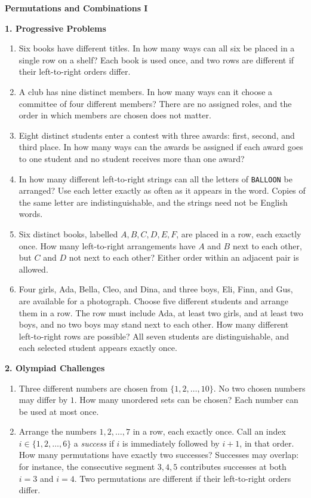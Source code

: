 \documentclass[11pt]{article}
\newcommand{\stageheading}[1]{%
  \par\Needspace{6\baselineskip}%
  \addvspace{.65\baselineskip}%
  {\centering\large\bfseries #1\par}%
  \nopagebreak[4]}
\begin{document}
{\centering\Large\bfseries Permutations and Combinations I\par}

\stageheading{1. Progressive Problems}

\begin{enumerate}[label=\textbf{\arabic*.}]
\item Six books have different titles. In how many ways can all six be
placed in a single row on a shelf? Each book is used once, and two rows
are different if their left-to-right orders differ.

\item A club has nine distinct members. In how many ways can it choose
a committee of four different members? There are no assigned roles, and
the order in which members are chosen does not matter.

\item Eight distinct students enter a contest with three awards: first,
second, and third place. In how many ways can the awards be assigned if
each award goes to one student and no student receives more than one award?

\item In how many different left-to-right strings can all the letters of
\texttt{BALLOON} be arranged? Use each letter exactly as often as it appears
in the word. Copies of the same letter are indistinguishable, and the
strings need not be English words.

\item Six distinct books, labelled $A,B,C,D,E,F$, are placed in a row,
each exactly once. How many left-to-right arrangements have $A$ and $B$
next to each other, but $C$ and $D$ not next to each other? Either order
within an adjacent pair is allowed.

\item Four girls, Ada, Bella, Cleo, and Dina, and three boys, Eli, Finn,
and Gus, are available for a photograph. Choose five different students
and arrange them in a row. The row must include Ada, at least two girls,
and at least two boys, and no two boys may stand next to each other.
How many different left-to-right rows are possible? All seven students
are distinguishable, and each selected student appears exactly once.
\end{enumerate}

\stageheading{2. Olympiad Challenges}

\begin{enumerate}[label=\textbf{\arabic*.},start=7]
\item Three different numbers are chosen from $\{1,2,\ldots,10\}$.
No two chosen numbers may differ by $1$. How many unordered sets can be
chosen? Each number can be used at most once.

\item Arrange the numbers $1,2,\ldots,7$ in a row, each exactly once.
Call an index $i\in\{1,2,\ldots,6\}$ a \emph{success} if $i$ is
immediately followed by $i+1$, in that order. How many permutations
have exactly two successes? Successes may overlap: for instance,
the consecutive segment $3,4,5$ contributes successes at both $i=3$
and $i=4$. Two permutations are different if their left-to-right orders differ.
\end{enumerate}
\end{document}

